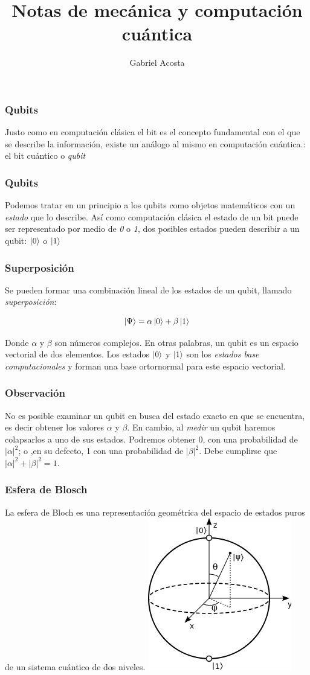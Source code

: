 \documentclass{beamer}
\title{Notas de mecánica y computación cuántica}
\author{Gabriel Acosta}
\begin{document}
\begin{frame}
  \titlepage
\end{frame}

\begin{frame}
  \frametitle{Qubits}
  Justo como en computación clásica el bit es el concepto fundamental con el que se describe la información,
  existe un análogo al mismo en computación cuántica.: el bit cuántico o \textit{qubit}
  
\end{frame}

\begin{frame}
  \frametitle{Qubits}
  Podemos tratar en un principio a los qubits como objetos matemáticos con un \textit{estado} que lo describe.
  Así como computación clásica el estado de un bit puede ser representado por medio de \textit{0} o
  \textit{1}, dos posibles estados pueden describir a un qubit: $\ket{0}$ o $\ket{1}$
\end{frame}

\begin{frame}
  \frametitle{Superposición}
  Se pueden formar una combinación lineal de los estados de un qubit, llamado \textit{superposición}:
  

  $$\ket{\Psi} = \alpha\ket{0} + \beta\ket{1}$$

  Donde $\alpha$ y $\beta$ son números complejos.
  En otras palabras, un qubit es un espacio vectorial de dos elementos.
  Los estados $\ket{0}$ y $\ket{1}$ son los \textit{estados base computacionales} y forman
  una base ortornormal para este espacio vectorial.

  
\end{frame}

\begin{frame}
  \frametitle{Observación}
  No es posible examinar un qubit en busca del estado exacto en que se encuentra, es decir obtener los valores
  $\alpha$ y $\beta$. En cambio, al \textit{medir} un qubit haremos colapsarlos a uno de sus estados.
  Podremos obtener 0, con una probabilidad de $|\alpha|^{2}$; o ,en su defecto, 1 con una probabilidad  de
  $|\beta|^{2}$.
  Debe cumplirse que $|\alpha|^{2} + |\beta|^{2} = 1$.
\end{frame}

\begin{frame}
  \frametitle{Esfera de Blosch}
  La esfera de Bloch es una representación geométrica del espacio de estados puros de un sistema cuántico de dos niveles.
      \includegraphics[scale=.60]{blochsphere.png}
\end{frame}
\end{document}
